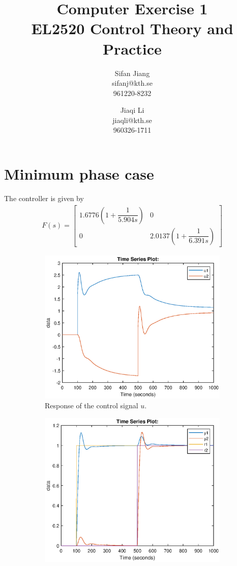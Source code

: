 \documentclass[11pt,a4paper]{article}
\title{
	Computer Exercise 1\\
	EL2520 Control Theory and Practice
}
\author{
	Sifan Jiang\\
	sifanj@kth.se\\
	961220-8232
	\and
	Jiaqi Li\\
	jiaqli@kth.se\\
	960326-1711
}
\begin{document}
\maketitle

\section*{Minimum phase case}
\par The controller is given by
\begin{align*}
	F(s) = \begin{bmatrix}
		1.6776(1+\dfrac{1}{5.904s}) & 0 \\
		0 & 2.0137(1+\dfrac{1}{6.391s})
	\end{bmatrix}		
\end{align*}
\begin{figure}[!ht]
	\footnotesize
	\centering 
	\begin{subfigure}[t]{.495\linewidth}
		\includegraphics[width=\columnwidth]{3231}
		\caption{Response of the control signal $u$.}
		\label{fig:3231}
	\end{subfigure}
	\begin{subfigure}[t]{.495\linewidth}
		\includegraphics[width=\columnwidth]{3232}

\end{subfigure}
\end{figure}
\end{document}
